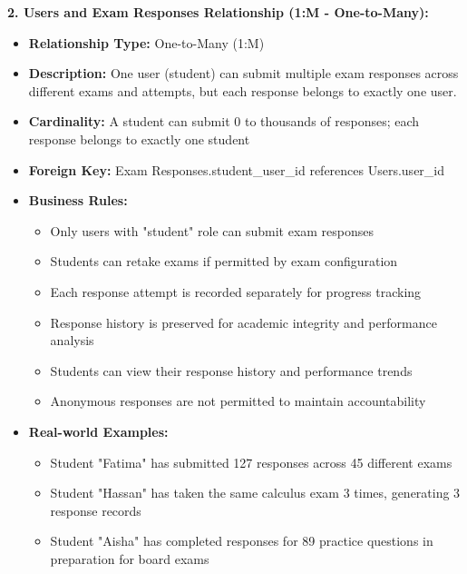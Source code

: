 \documentclass[12pt,a4paper,oneside]{book}
\begin{document}
\textbf{2. Users and Exam Responses Relationship (1:M - One-to-Many):}
\begin{itemize}
    \item \textbf{Relationship Type:} One-to-Many (1:M)
    \item \textbf{Description:} One user (student) can submit multiple exam responses across different exams and attempts, but each response belongs to exactly one user.
    \item \textbf{Cardinality:} A student can submit 0 to thousands of responses; each response belongs to exactly one student
    \item \textbf{Foreign Key:} Exam Responses.student\_user\_id references Users.user\_id
    \item \textbf{Business Rules:}
        \begin{itemize}
            \item Only users with "student" role can submit exam responses
            \item Students can retake exams if permitted by exam configuration
            \item Each response attempt is recorded separately for progress tracking
            \item Response history is preserved for academic integrity and performance analysis
            \item Students can view their response history and performance trends
            \item Anonymous responses are not permitted to maintain accountability
        \end{itemize}
    \item \textbf{Real-world Examples:}
        \begin{itemize}
            \item Student "Fatima" has submitted 127 responses across 45 different exams
            \item Student "Hassan" has taken the same calculus exam 3 times, generating 3 response records
            \item Student "Aisha" has completed responses for 89 practice questions in preparation for board exams
        \end{itemize}
\end{itemize}
\end{document}
